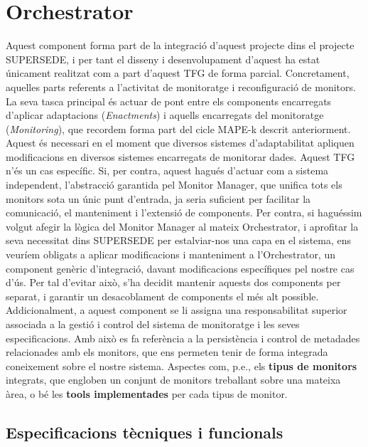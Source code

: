 \section{Orchestrator}

Aquest component forma part de la integració d'aquest projecte dins el projecte SUPERSEDE, i per tant el disseny i desenvolupament d'aquest ha estat únicament realitzat com a part d'aquest TFG de forma parcial. Concretament, aquelles parts referents a l'activitat de monitoratge i reconfiguració de monitors.\\

La seva tasca principal és actuar de pont entre els components encarregats d'aplicar adaptacions (\textit{Enactments}) i aquells encarregats del monitoratge (\textit{Monitoring}), que recordem forma part del cicle MAPE-k descrit anteriorment. Aquest és necessari en el moment que diversos sistemes d'adaptabilitat apliquen modificacions en diversos sistemes encarregats de monitorar dades. Aquest TFG n'és un cas específic. Si, per contra, aquest hagués d'actuar com a sistema independent, l'abstracció garantida pel Monitor Manager, que unifica tots els monitors sota un únic punt d'entrada, ja seria suficient per facilitar la comunicació, el manteniment i l'extensió de components. Per contra, si haguéssim volgut afegir la lògica del Monitor Manager al mateix Orchestrator, i aprofitar la seva necessitat dins SUPERSEDE per estalviar-nos una capa en el sistema, ens veuríem obligats a aplicar modificacions i manteniment a l'Orchestrator, un component genèric d'integració, davant modificacions específiques pel nostre cas d'ús. Per tal d'evitar això, s'ha decidit mantenir aquests dos components per separat, i garantir un desacoblament de components el més alt possible.\\

Addicionalment, a aquest component se li assigna una responsabilitat superior associada a la gestió i control del sistema de monitoratge i les seves especificacions. Amb això es fa referència a la persistència i control de metadades relacionades amb els monitors, que ens permeten tenir de forma integrada coneixement sobre el nostre sistema. Aspectes com, p.e., els \textbf{tipus de monitors} integrats, que engloben un conjunt de monitors treballant sobre una mateixa àrea, o bé les \textbf{tools implementades} per cada tipus de monitor.\\

\subsection{Especificacions tècniques i funcionals}

